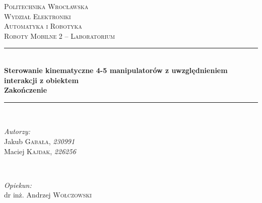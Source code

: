 \documentclass[polish,polish]{article}
\begin{document}
\lstset{
    frame       = single,
    numbers     = left,
    showspaces  = false,
    showstringspaces    = false,
    captionpos  = t,
    caption     = \lstname,
    breaklines=true,
}
\begin{titlepage}
\newcommand{\HRule}{\rule{\linewidth}{0.5mm}} %

\center %
 

\textsc{\LARGE Politechnika Wrocławska}\\[0.25cm] %
\textsc{\Large Wydział Elektroniki}\\[0.75cm] %
\textsc{\Large Automatyka i Robotyka}\\[0.3cm] %
\textsc{\large Roboty Mobilne 2 -- Laboratorium}\\[0.5cm] %


\HRule \\[0.4cm]
{ \huge \bfseries Sterowanie kinematyczne 4-5 manipulatorów z uwzględnieniem interakcji z obiektem \\
\normalsize \Large Zakończenie }\\[0.4cm] %
\HRule \\[1.5cm]
 

\begin{minipage}{0.4\textwidth}
\begin{flushleft} \large
\emph{Autorzy:}\\
Jakub \textsc{Gabała}, \textit{230991}\\ %
Maciej \textsc{Kajdak}, \textit{226256}\\ %
\end{flushleft}
\end{minipage}
~
\begin{minipage}{0.4\textwidth}
\begin{flushright} \large
\emph{Opiekun:} \\
dr inż. Andrzej \textsc{Wołczowski} %
\end{flushright}
\end{minipage}\\[2cm]


\end{titlepage}
\end{document}
